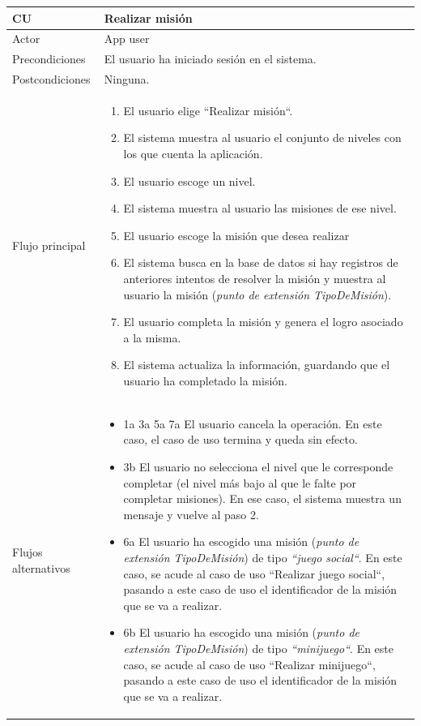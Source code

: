 \documentclass[twoside]{report}
\newcommand\addrow[2]{#1 &#2\\ }
\newcommand\addheading[2]{#1 &#2\\ \hline}
\newcommand\tabularhead{\begin{tabular}{lp{0.7\textwidth}}
\hline
}
\newenvironment{usecase}{\tabularhead}
{\hline\end{tabular}}
\begin{document}
\vspace{0.5cm}

\begin{usecase}
  \addheading{\textbf{CU\arabic{usecase}}}{Realizar misión} 
  \addrow{Actor}{App user}
  \addrow{Precondiciones}{El usuario ha iniciado sesión en el sistema.}
  \addrow{Postcondiciones}{Ninguna.}
  \addrow{Flujo principal}{
  		\begin{enumerate}
  		\item El usuario elige “Realizar misión“. %
  		\item El sistema muestra al usuario el conjunto de niveles con los que cuenta la aplicación. %
  		\item El usuario escoge un nivel. %
  		\item El sistema muestra al usuario las misiones de ese nivel. %
  		\item El usuario escoge la misión que desea realizar %
  		\item El sistema busca en la base de datos si hay registros de anteriores intentos de resolver la misión y muestra al usuario la misión (\textit{punto de extensión TipoDeMisión}). %
  		\item El usuario completa la misión y genera el logro asociado a la misma.%
  		\item El sistema actualiza la información, guardando que el usuario ha completado la misión. %
  		\end{enumerate}
  }
  \addrow{Flujos alternativos}{
  		\begin{itemize}
  		\item 1a 3a 5a 7a El usuario cancela la operación. En este caso, el caso de uso termina y queda sin efecto.
        \item 3b El usuario no selecciona el nivel que le corresponde completar (el nivel más bajo al que le falte por completar misiones). En ese caso, el sistema muestra un mensaje y vuelve al paso 2.
        
        \item 6a El usuario ha escogido una misión (\textit{punto de extensión TipoDeMisión}) de tipo \textit{“juego social“}. En este caso, se acude al caso de uso “Realizar juego social“, pasando a este caso de uso el identificador de la misión que se va a realizar.
        
        \item 6b El usuario ha escogido una misión (\textit{punto de extensión TipoDeMisión}) de tipo \textit{“minijuego“}. En este caso, se acude al caso de uso “Realizar minijuego“, pasando a este caso de uso el identificador de la misión que se va a realizar.
        

\end{itemize}}
\end{usecase}
\end{document}
